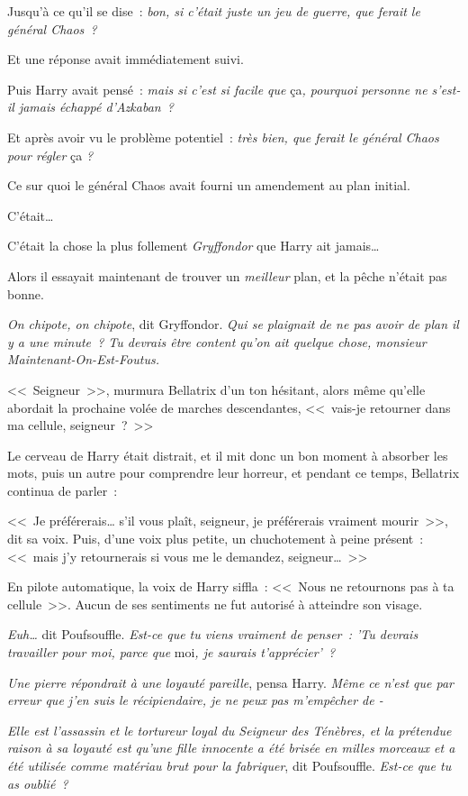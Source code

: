 Jusqu'à ce qu'il se dise~: \emph{bon, si c'était juste un jeu de guerre, que ferait le général Chaos~?}

Et une réponse avait immédiatement suivi.

Puis Harry avait pensé~: \emph{mais si c'est si facile que} ça\emph{, pourquoi personne ne s'est-il jamais échappé d'Azkaban~?}

Et après avoir vu le problème potentiel~: \emph{très bien, que ferait le général Chaos pour régler} ça \emph{?}

Ce sur quoi le général Chaos avait fourni un amendement au plan initial.

C'était…

C'était la chose la plus follement \emph{Gryffondor} que Harry ait jamais…

Alors il essayait maintenant de trouver un \emph{meilleur} plan, et la pêche n'était pas bonne.

\emph{On chipote, on chipote}, dit Gryffondor. \emph{Qui se plaignait de ne pas avoir de plan il y a une minute~? Tu devrais être content qu'on ait quelque chose, monsieur Maintenant-On-Est-Foutus.}

<<~Seigneur~>>, murmura Bellatrix d'un ton hésitant, alors même qu'elle abordait la prochaine volée de marches descendantes, <<~vais-je retourner dans ma cellule, seigneur~?~>>

Le cerveau de Harry était distrait, et il mit donc un bon moment à absorber les mots, puis un autre pour comprendre leur horreur, et pendant ce temps, Bellatrix continua de parler~:

<<~Je préférerais… s'il vous plaît, seigneur, je préférerais vraiment mourir~>>, dit sa voix. Puis, d'une voix plus petite, un chuchotement à peine présent~: <<~mais j'y retournerais si vous me le demandez, seigneur…~>>

En pilote automatique, la voix de Harry siffla~: <<~Nous ne retournons pas à ta cellule~>>. Aucun de ses sentiments ne fut autorisé à atteindre son visage.

\emph{Euh…} dit Poufsouffle. \emph{Est-ce que tu viens vraiment de penser~: 'Tu devrais travailler pour moi, parce que} moi\emph{, je saurais t'apprécier'~?}

\emph{Une pierre répondrait à une loyauté pareille}, pensa Harry. \emph{Même ce n'est que par erreur que j'en suis le récipiendaire, je ne peux pas m'empêcher de -}

\emph{Elle est l'assassin et le tortureur loyal du Seigneur des Ténèbres, et la prétendue raison à sa loyauté est qu'une fille innocente a été brisée en milles morceaux et a été utilisée comme matériau brut pour la fabriquer}, dit Poufsouffle. \emph{Est-ce que tu as oublié~?}

